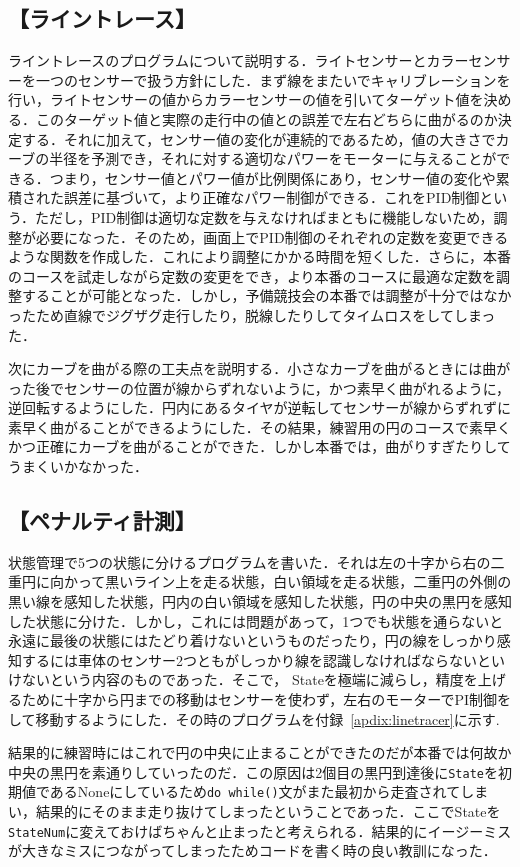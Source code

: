 \begin{multicols*}{2}
\subsection*{【ライントレース】}
ライントレースのプログラムについて説明する．ライトセンサーとカラーセンサーを一つのセンサーで扱う方針にした．まず線をまたいでキャリブレーションを行い，ライトセンサーの値からカラーセンサーの値を引いてターゲット値を決める．このターゲット値と実際の走行中の値との誤差で左右どちらに曲がるのか決定する．それに加えて，センサー値の変化が連続的であるため，値の大きさでカーブの半径を予測でき，それに対する適切なパワーをモーターに与えることができる．つまり，センサー値とパワー値が比例関係にあり，センサー値の変化や累積された誤差に基づいて，より正確なパワー制御ができる．これをPID制御という．ただし，PID制御は適切な定数を与えなければまともに機能しないため，調整が必要になった．そのため，画面上でPID制御のそれぞれの定数を変更できるような関数を作成した．これにより調整にかかる時間を短くした．さらに，本番のコースを試走しながら定数の変更をでき，より本番のコースに最適な定数を調整することが可能となった．しかし，予備競技会の本番では調整が十分ではなかったため直線でジグザグ走行したり，脱線したりしてタイムロスをしてしまった．

次にカーブを曲がる際の工夫点を説明する．小さなカーブを曲がるときには曲がった後でセンサーの位置が線からずれないように，かつ素早く曲がれるように，逆回転するようにした．円内にあるタイヤが逆転してセンサーが線からずれずに素早く曲がることができるようにした．その結果，練習用の円のコースで素早くかつ正確にカーブを曲がることができた．しかし本番では，曲がりすぎたりしてうまくいかなかった．

\subsection*{【ペナルティ計測】}
状態管理で5つの状態に分けるプログラムを書いた．それは左の十字から右の二重円に向かって黒いライン上を走る状態，白い領域を走る状態，二重円の外側の黒い線を感知した状態，円内の白い領域を感知した状態，円の中央の黒円を感知した状態に分けた．しかし，これには問題があって，1つでも状態を通らないと永遠に最後の状態にはたどり着けないというものだったり，円の線をしっかり感知するには車体のセンサー2つともがしっかり線を認識しなければならないといけないという内容のものであった．そこで， Stateを極端に減らし，精度を上げるために十字から円までの移動はセンサーを使わず，左右のモーターでPI制御をして移動するようにした．その時のプログラムを付録~\ref{apdix:linetracer}に示す. 

結果的に練習時にはこれで円の中央に止まることができたのだが本番では何故か中央の黒円を素通りしていったのだ．この原因は2個目の黒円到達後に\texttt{State}を初期値であるNoneにしているため\texttt{do while()}文がまた最初から走査されてしまい，結果的にそのまま走り抜けてしまったということであった．ここでStateを\texttt{StateNum}に変えておけばちゃんと止まったと考えられる．結果的にイージーミスが大きなミスにつながってしまったためコードを書く時の良い教訓になった．


\end{multicols*}
